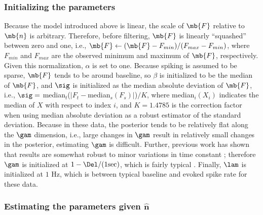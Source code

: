 \subsubsection{Initializing the parameters} \label{sec:init}

Because the model introduced above is linear, the scale of $\mb{F}$ relative to $\mb{n}$ is arbitrary.  Therefore, before filtering, $\mb{F}$ is linearly ``squashed'' between zero and one, i.e., $\mb{F} \leftarrow (\mb{F} - F_{min})/(F_{max}-F_{min})$, where $F_{min}$ and $F_{max}$ are the observed minimum and maximum of $\mb{F}$, respectively.  Given this normalization, $\alpha$ is set to one.  Because spiking is assumed to be sparse, $\mb{F}$ tends to be around baseline, so $\beta$ is initialized to be the median of $\mb{F}$, and $\sig$ is initialized as the median absolute deviation of $\mb{F}$, i.e.,  $\sig=$ median$_t$($|F_t-$median$_s(F_s)|$)$/K$, where median$_i(X_i)$ indicates the median of $X$ with respect to index $i$, and $K=1.4785$ is the correction factor when using median absolute deviation as a robust estimator of the standard deviation.  Because in these data, the posterior tends to be relatively flat along the $\gam$ dimension, i.e.,  large changes in $\gam$ result in relatively small changes in the posterior, estimating $\gam$ is difficult.  Further, previous work has shown that results are somewhat robust to minor variations in time constant \cite{YaksiFriedrich06}; therefore $\gam$ is initialized at $1-\Del/(1 \text{sec})$, which is fairly typical \cite{PologrutoSvoboda04}. Finally, $\lam$ is initialized at $1$ Hz, which is between typical baseline and evoked spike rate for these data.

\subsubsection{Estimating the parameters given $\widehat{\mathbf{n}}$} \label{sec:242}


